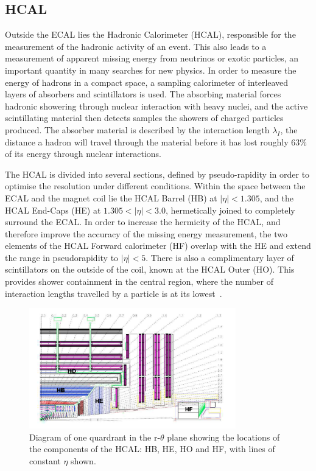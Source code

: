 \subsection{HCAL}

Outside the ECAL lies the Hadronic Calorimeter (HCAL),  responsible for the measurement of the hadronic activity of an event. This also leads to a measurement of apparent missing energy from neutrinos or exotic particles, an important quantity in many searches for new physics. In order to measure the energy of hadrons in a compact space, a sampling calorimeter of interleaved layers of absorbers and scintillators is used. The absorbing material forces hadronic showering through nuclear interaction with heavy nuclei, and the active scintillating material then detects samples the showers of charged particles produced. The absorber material is described by the interaction length $\lambda_{I}$, the distance a hadron will travel through the material before it has lost roughly 63\% of its energy through nuclear interactions.

 The HCAL is divided into several sections, defined by pseudo-rapidity in order to optimise the resolution under different conditions. Within the space between the ECAL and the magnet coil lie the HCAL Barrel (HB) at $|\eta| < 1.305$, and the HCAL End-Caps (HE) at $1.305 < |\eta| < 3.0$, hermetically joined to completely surround the ECAL. In order to increase the hermicity of the HCAL, and therefore improve the accuracy of the missing energy measurement, the two elements of the HCAL Forward calorimeter (HF) overlap with the HE and extend the range in pseudorapidity to $|\eta|<5$. There is also a complimentary layer of scintillators on the outside of the coil, known at the HCAL Outer (HO).  This provides shower containment in the central region, where the number of interaction lengths travelled by a particle is at its lowest~\cite{HCALTDR}.


\begin{figure}
\centering
\includegraphics[width=0.8\textwidth]{Figures/Detector/HCAL}
\caption{Diagram of one quardrant in the r-$\theta$ plane showing the locations of the components of the HCAL: HB, HE, HO and HF, with lines of constant $\eta$ shown.}
\label{fig:HCAL}
\end{figure}


